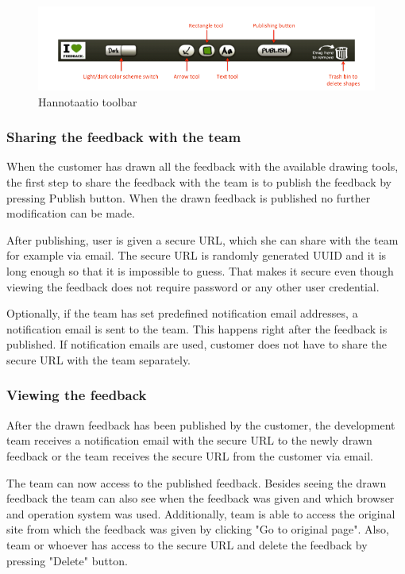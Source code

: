 \documentclass[english,12pt,a4paper,pdftex]{article}
\begin{document}
\begin{figure}[htb]
\begin{center}
\includegraphics[width=1.0\textwidth]{drawing_tools_annotated_crop.png}
\end{center}
\caption{Hannotaatio toolbar}
\end{figure}

\subsubsection{Sharing the feedback with the team}

When the customer has drawn all the feedback with the available drawing tools, the first step to share the feedback with the team is to publish the feedback by pressing Publish button. When the drawn feedback is published no further modification can be made.

After publishing, user is given a secure \ac{URL}, which she can share with the team for example via email. The secure \ac{URL} is randomly generated \ac{UUID} and it is long enough so that it is impossible to guess. That makes it secure even though viewing the feedback does not require password or any other user credential.

Optionally, if the team has set predefined notification email addresses, a notification email is sent to the team. This happens right after the feedback is published. If notification emails are used, customer does not have to share the secure \ac{URL} with the team separately.

\subsubsection{Viewing the feedback}

After the drawn feedback has been published by the customer, the development team receives a notification email with the secure \ac{URL} to the newly drawn feedback or the team receives the secure \ac{URL} from the customer via email.

The team can now access to the published feedback. Besides seeing the drawn feedback the team can also see when the feedback was given and which browser and operation system was used. Additionally, team is able to access the original site from which the feedback was given by clicking "Go to original page". Also, team or whoever has access to the secure \ac{URL} and delete the feedback by pressing "Delete" button.
\end{document}
